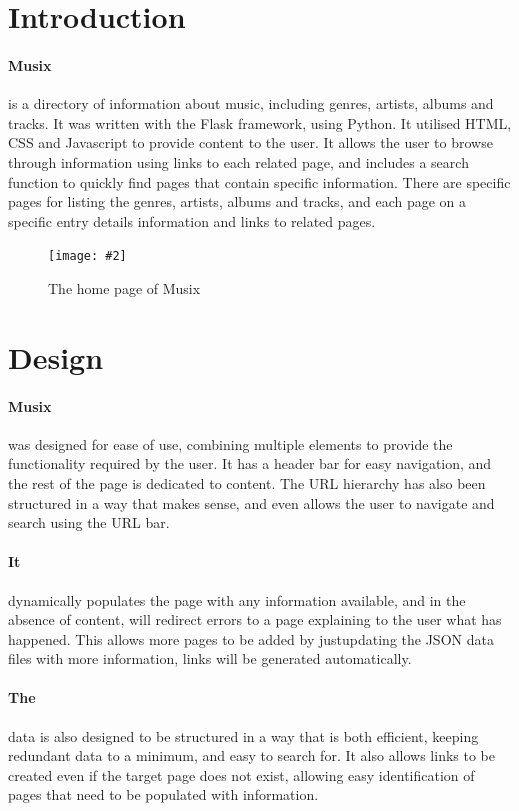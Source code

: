 \documentclass[10pt, a4paper]{article}
\title{\mytitle}
\author{\myauthor\hspace{1em}\\\contact\\Edinburgh Napier University\hspace{0.5em}-\hspace{0.5em}\mymodule}
\date{}
\newcommand{\figuremacro}[5]{
    \begin{figure}[#1]
        \centering
        \texttt{[image: \#2]}
        \caption[#3]{\textbf{#3}#4}
        \label{fig:#2}
    \end{figure}
}
\begin{document}
    \maketitle
    
    \section{Introduction}
    \paragraph{Musix} is a directory of information about music, including genres, artists, albums and tracks. It was written with the Flask framework, using Python. It utilised HTML, CSS and Javascript to provide content to the user. It allows the user to browse through information using links to each related page, and includes a search function to quickly find pages that contain specific information. There are specific pages for listing the genres, artists, albums and tracks, and each page on a specific entry details information and links to related pages.
    
    \figuremacro{h}{images/main.png}{}{The home page of Musix}{1.0}
    
    \section{Design}
    \paragraph{Musix} was designed for ease of use, combining multiple elements to provide the functionality required by the user. It has a header bar for easy navigation, and the rest of the page is dedicated to content. The URL hierarchy has also been structured in a way that makes sense, and even allows the user to navigate and search using the URL bar.
    \paragraph{It} dynamically populates the page with any information available, and in the absence of content, will redirect errors to a page explaining to the user what has happened. This allows more pages to be added by justupdating the JSON data files with more information, links will be generated automatically.
    \paragraph{The} data is also designed to be structured in a way that is both efficient, keeping redundant data to a minimum, and easy to search for. It also allows links to be created even if the target page does not exist, allowing easy identification of pages that need to be populated with information.
    
\end{document}
